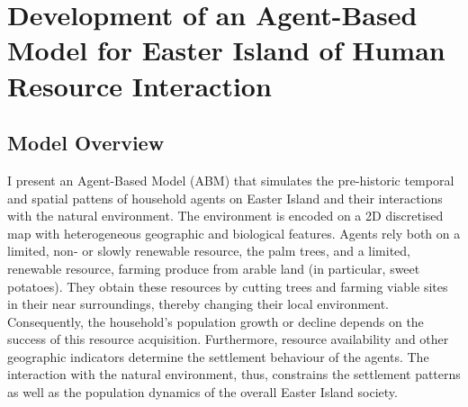 \chapter{Development of an Agent-Based Model for Easter Island of Human Resource Interaction}\label{chapter:Methods}
\FloatBarrier
\section{Model Overview}
I present an Agent-Based Model (ABM) that simulates the pre-historic temporal and spatial pattens of household agents on Easter Island and their interactions with the natural environment. 
The environment is encoded on a 2D discretised map with heterogeneous geographic and biological features.
Agents rely both on a limited, non- or slowly renewable resource, the palm trees, and a limited, renewable resource, farming produce from arable land (in particular, sweet potatoes). 
They obtain these resources by cutting trees and farming viable sites in their near surroundings, thereby changing their local environment.
Consequently, the household's population growth or decline depends on the success of this resource acquisition. 
Furthermore, resource availability and other geographic indicators determine the settlement behaviour of the agents.
The interaction with the natural environment, thus, constrains the settlement patterns as well as the population dynamics of the overall Easter Island society.


